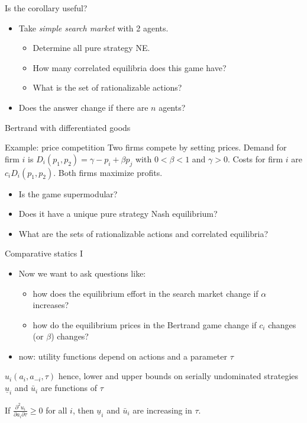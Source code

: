 \documentclass[bigger]{beamer}
\begin{document}
\begin{frame}[label={sec:orgheadline12}]{Is the corollary useful?}
\begin{itemize}
\item Take \emph{simple search market} with 2 agents.
\begin{itemize}
\item Determine all pure strategy NE.
\item How many correlated equilibria does this game have?
\item What is the set of rationalizable actions?
\end{itemize}

\item Does the answer change if there are \(n\) agents?
\end{itemize}
\end{frame}
\begin{frame}[label={sec:orgheadline13}]{Bertrand with differentiated goods}
\begin{block}{Example: price competition}
Two firms compete by setting prices. Demand for firm \(i\) is
\(D_i(p_1,p_2)=\gamma-p_i+\beta p_j\)
with \(0<\beta< 1\) and \(\gamma>0\). Costs for firm \(i\) are \(c_i D_i(p_1,p_2)\). Both firms maximize profits.
\end{block}

\begin{itemize}
\item Is the game supermodular?
\item Does it have a unique pure strategy Nash equilibrium?
\item What are the sets of rationalizable actions and correlated equilibria?
\end{itemize}
\end{frame}


\begin{frame}[label={sec:orgheadline14}]{Comparative statics I}
\begin{itemize}
\item Now we want to ask questions like:
\begin{itemize}
\item how does the equilibrium effort in the search market change if \(\alpha\) increases?
\item how do the equilibrium prices in the Bertrand game change if \(c_i\) changes (or \(\beta\)) changes?
\end{itemize}
\item now: utility functions depend on actions and a parameter \(\tau\) \\
\end{itemize}
\(u_i(a_i,a_{-i},\tau)\)
hence, lower and upper bounds on serially undominated strategies \(\underline u_i\) and \(\bar u_i\) are functions of \(\tau\)
\begin{theorem}
If \(\frac{\partial^2 u_i}{\partial a_i\partial \tau}\geq 0\) for all \(i\), then \(\underline{u}_i\) and \(\bar u_i\) are increasing in \(\tau\).
\end{theorem}
\end{frame}
\end{document}
